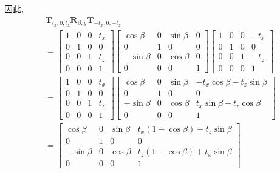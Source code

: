 \begin{example}
    因此,
    $$
    \begin{aligned}
    & \mathbf{T}_{t_{x}, 0, t_{z}} \mathbf{R}_{\beta, y} \mathbf{T}_{-t_{x}, 0,-t_{z}} \\
    &= {\left[\begin{array}{cccc}
    1 & 0 & 0 & t_{x} \\
    0 & 1 & 0 & 0 \\
    0 & 0 & 1 & t_{z} \\
    0 & 0 & 0 & 1
    \end{array}\right]\left[\begin{array}{cccc}
    \cos \beta & 0 & \sin \beta & 0 \\
    0 & 1 & 0 & 0 \\
    -\sin \beta & 0 & \cos \beta & 0 \\
    0 & 0 & 0 & 1
    \end{array}\right]\left[\begin{array}{cccc}
    1 & 0 & 0 & -t_{x} \\
    0 & 1 & 0 & 0 \\
    0 & 0 & 1 & -t_{z} \\
    0 & 0 & 0 & 1
    \end{array}\right] } \\
    &= {\left[\begin{array}{cccc}
    1 & 0 & 0 & t_{x} \\
    0 & 1 & 0 & 0 \\
    0 & 0 & 1 & t_{z} \\
    0 & 0 & 0 & 1
    \end{array}\right]\left[\begin{array}{cccc}
    \cos \beta & 0 & \sin \beta & -t_{x} \cos \beta-t_{z} \sin \beta \\
    0 & 1 & 0 & 0 \\
    -\sin \beta & 0 & \cos \beta & t_{x} \sin \beta-t_{z} \cos \beta \\
    0 & 0 & 0 & 1
    \end{array}\right] } \\
    &= {\left[\begin{array}{ccccc}
    \cos \beta & 0 & \sin \beta & t_{x}(1-\cos \beta)-t_{z} \sin \beta \\
    0 & 1 & 0 & 0 \\
    -\sin \beta & 0 & \cos \beta & t_{z}(1-\cos \beta)+t_{x} \sin \beta \\
    0 & 0 & 0 & 1
    \end{array}\right] }
    \end{aligned}
    $$
\end{example}

